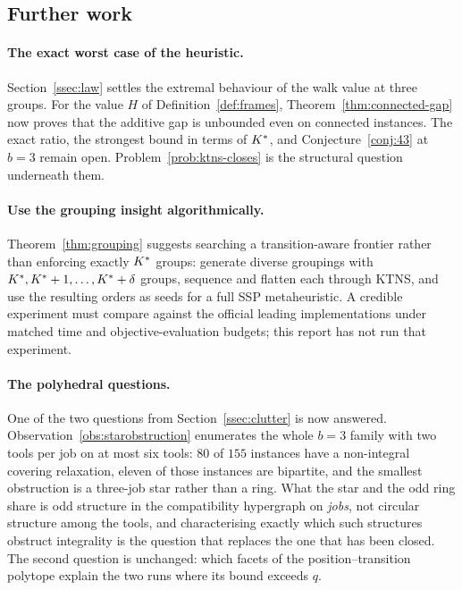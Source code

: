 \subsection{Further work}\label{ssec:further}

\paragraph{The exact worst case of the heuristic.}
Section~\ref{ssec:law} settles the extremal behaviour of the walk value at three
groups. For the value $H$ of Definition~\ref{def:frames},
Theorem~\ref{thm:connected-gap} now proves that the additive gap is unbounded even on
connected instances. The exact ratio, the strongest bound in terms of $K^{\ast}$, and
Conjecture~\ref{conj:43} at $b=3$ remain open.
Problem~\ref{prob:ktns-closes} is the structural question underneath them.

\paragraph{Use the grouping insight algorithmically.}
Theorem~\ref{thm:grouping} suggests searching a transition-aware frontier rather than
enforcing exactly $K^{\ast}$ groups: generate diverse groupings with
$K^{\ast},K^{\ast}+1,\ldots,K^{\ast}+\delta$ groups, sequence and flatten each through KTNS, and
use the resulting orders as seeds for a full SSP metaheuristic. A credible experiment
must compare against the official leading implementations under matched time and
objective-evaluation budgets; this report has not run that experiment.

\paragraph{The polyhedral questions.}
One of the two questions from Section~\ref{ssec:clutter} is now answered.
Observation~\ref{obs:starobstruction} enumerates the whole $b=3$ family with two tools
per job on at most six tools: $80$ of $155$ instances have a non-integral covering
relaxation, eleven
of those instances are bipartite, and the smallest obstruction is a three-job star
rather than a ring. What the star and the odd ring share is odd structure in the
compatibility hypergraph on \emph{jobs}, not circular structure among the tools, and
characterising exactly which such structures obstruct integrality is the question that
replaces the one that has been closed. The second question is unchanged: which facets of
the position--transition polytope explain the two runs where its bound exceeds $q$.

